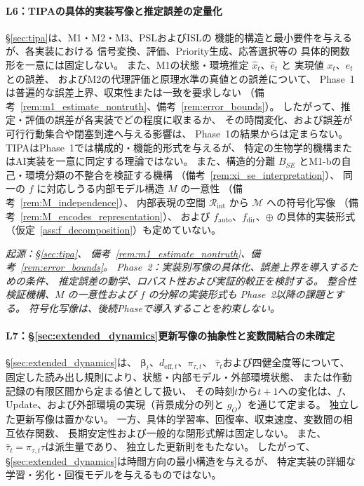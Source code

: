 \paragraph{L6：TIPAの具体的実装写像と推定誤差の定量化}
\label{lim:L6}
\S\ref{sec:tipa}は、M1・M2・M3、PSLおよびISLの
機能的構造と最小要件を与えるが、各実装における
信号変換、評価、Priority生成、応答選択等の
具体的関数形を一意には固定しない。
また、M1の状態・環境推定 $\hat x_t$、$\hat e_t$ と
実現値 $x_t$、$e_t$ との誤差、
およびM2の代理評価と原理水準の真値との誤差について、
Phase~1は普遍的な誤差上界、収束性または一致を要求しない
（備考~\ref{rem:m1_estimate_nontruth}、備考~\ref{rem:error_bounds}）。
したがって、推定・評価の誤差が各実装でどの程度に収まるか、
その時間変化、および誤差が可行行動集合や閉塞到達へ与える影響は、
Phase~1の結果からは定まらない。
TIPAはPhase~1では構成的・機能的形式を与えるが、
特定の生物学的機構またはAI実装を一意に同定する理論ではない。
また、構造的分離 $B_{SE}$ とM1-bの自己・環境分類の不整合を検証する機構
（備考~\ref{rem:xi_se_interpretation}）、
同一の $f$ に対応しうる内部モデル構造 $M$ の一意性
（備考~\ref{rem:M_independence}）、
内部表現の空間 $\mathcal{R}_{\mathrm{int}}$ から $\mathcal{M}$ への符号化写像
（備考~\ref{rem:M_encodes_representation}）、
および $f_{\mathrm{auto}}$、$f_{\mathrm{dir}}$、$\oplus$ の具体的実装形式
（仮定~\ref{ass:f_decomposition}）も定めていない。

\medskip
\noindent\textit{起源：\S\ref{sec:tipa}、
備考~\ref{rem:m1_estimate_nontruth}、備考~\ref{rem:error_bounds}。
Phase~2：実装別写像の具体化、誤差上界を導入するための条件、
推定誤差の動学、ロバスト性および実証的較正を検討する。
整合性検証機構、$M$ の一意性および $f$ の分解の実装形式も
Phase~2以降の課題とする。
符号化写像は、後続Phaseで導入することを約束しない。}

\paragraph{L7：\S\ref{sec:extended_dynamics}更新写像の抽象性と変数間結合の未確定}
\label{lim:L7}
\S\ref{sec:extended_dynamics}は、
$\boldsymbol{\beta}_t$、$d_{\mathrm{eff},t}$、$\pi_{\tau,t}$、
$\widehat{\tau}_{t}$および四健全度等について、
固定した読み出し規則により、状態・内部モデル・外部環境状態、
または作動記録の有限区間から定まる値として扱い、
その時刻$t$から$t+1$への変化は、$f$、Update、および外部環境の実現（背景成分の列と $g_O$）を通じて定まる。
独立した更新写像は置かない。
一方、具体的学習率、回復率、収束速度、変数間の相互依存関数、
長期安定性および一般的な閉形式解は固定しない。
また、$\widehat{\tau}_{t}=\pi_{\tau,t}\tau$は派生量であり、
独立した更新則をもたない。
したがって、\S\ref{sec:extended_dynamics}は時間方向の最小構造を与えるが、
特定実装の詳細な学習・劣化・回復モデルを与えるものではない。

